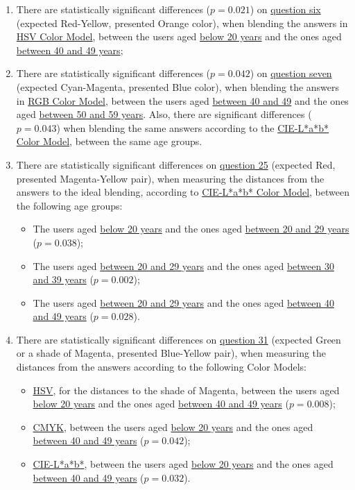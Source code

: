 \begin{enumerate}
  \setlength\itemsep{0.01em}
  \item There are statistically significant differences ($p = 0.021$) on \ul{question six} (expected Red-Yellow, presented Orange color), when blending the answers in \ul{HSV Color Model}, between the users aged \ul{below 20 years} and the ones aged \ul{between 40 and 49 years};
  \item There are statistically significant differences ($p = 0.042$) on \ul{question seven} (expected Cyan-Magenta, presented Blue color), when blending the answers in \ul{RGB Color Model}, between the users aged \ul{between 40 and 49} and the ones aged \ul{between 50 and 59 years}.
  Also, there are significant differences ($p = 0.043$) when blending the same answers according to the \ul{CIE-L*a*b* Color Model}, between the same age groups.
  \item There are statistically significant differences on \ul{question 25} (expected Red, presented Magenta-Yellow pair), when measuring the distances from the answers to the ideal blending, according to \ul{CIE-L*a*b* Color Model}, between the following age groups:
    \begin{itemize}
      \item The users aged \ul{below 20 years} and the ones aged \ul{between 20 and 29 years} ($p = 0.038$);
      \item The users aged \ul{between 20 and 29 years} and the ones aged \ul{between 30 and 39 years} ($p = 0.002$);
      \item The users aged \ul{between 20 and 29 years} and the ones aged \ul{between 40 and 49 years} ($p = 0.028$).
    \end{itemize}
  \item There are statistically significant differences on \ul{question 31} (expected Green or a shade of Magenta, presented Blue-Yellow pair), when measuring the distances from the answers according to the following Color Models:
    \begin{itemize}
      \item \ul{HSV}, for the distances to the shade of Magenta, between the users aged \ul{below 20 years} and the ones aged \ul{between 40 and 49 years} ($p = 0.008$);
      \item \ul{CMYK}, between the users aged \ul{below 20 years} and the ones aged \ul{between 40 and 49 years} ($p = 0.042$);
      \item \ul{CIE-L*a*b*}, between the users aged \ul{below 20 years} and the ones aged \ul{between 40 and 49 years} ($p = 0.032$).
    \end{itemize}
\end{enumerate} \par
